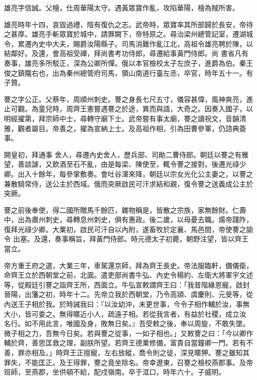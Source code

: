 \begin{pinyinscope}
 雄亮字信誠。父檜，仕周華陽太守。遇黃眾寶作亂，攻陷華陽，檜為賊所害。



 雄亮時年十四，哀毀過禮，陰有復仇之志。武帝時，眾寶率其所部歸於長安，帝待之甚厚。雄亮手斬眾寶於城中，請罪闕下，帝特原之。尋治梁州總管記室，遷湖城令，累遷內史中大夫，賜爵汝陽縣子。司馬消難作亂江北，高祖令雄亮聘於陳，以結鄰好。及還，會高祖受禪，拜尚書考功侍郎，尋遷給事黃門侍郎。尚
 書省凡有奏事，雄亮多所駁正，深為公卿所憚。俄以本官檢校太子左庶子，進爵為伯。秦王俊之鎮隴右也，出為秦州總管府司馬，領山南道行臺左丞，卒官，時年五十一。有子贊。



 謇之字公正。父蔡年，周順州刺史。謇之身長七尺五寸，儀容甚偉，風神爽亮，進止可觀。為童兒時，周齊王憲嘗遇謇之於途，異而與語，大奇之。因奏入國子，以明經擢第，拜宗師中士，尋轉守廟下士。武帝嘗有事太廟，謇之讀祝文，音韻清雅，觀者屬目。帝善之，擢為宣納上士。及高祖作相，引為田曹參軍，仍諮典簽事。



 開皇初，拜通事
 舍人，尋遷內史舍人，歷兵部、司勛二曹侍郎。朝廷以謇之有雅望，善談謔，又飲酒至石不亂，由是每梁、陳使至，輒令謇之接對。後遷光祿少卿。出入十餘年，每參掌敷奏。會吐谷渾來降，朝廷以宗女光化公主妻之，以謇之兼散騎常侍，送公主於西域。俄而突厥啟民可汗求結和親，復令謇之送義成公主於突厥。



 謇之前後奉使，得二國所贈馬千餘匹，雜物稱是，皆散之宗族，家無餘財。仁壽中，出為肅州刺史，尋轉息州刺史，俱有惠政。後二歲，以母憂去職。煬帝踐阼，復拜光祿少卿。大業初，啟民可汗自以內附，遂畜牧於定襄、馬邑間，帝使謇之諭令
 出塞。及還，奏事稱旨，拜黃門侍郎。時元德太子初薨，朝野注望，皆以齊王當立。



 帝方重王府之選，大業三年，車駕還京師，拜為齊王長史。帝法服臨軒，備儀衛，命齊王立於西朝堂之前，北面。遣吏部尚書牛弘、內史令楊約、左衛大將軍宇文述等，從殿廷引謇之詣齊王所，西面立。牛弘宣敕謂齊王曰：「我昔階緣恩寵，啟封晉陽，出籓之初，時年十二。先帝立我於西朝堂，乃令高熲、虞慶則、元旻等，從內送王子相於我。於時誡我曰：『以汝幼沖，未更世事，今令子相作輔於汝，事無大小，皆可委之。無得暱近小人，疏遠子相。若從我言者，有益於社稷，成立汝
 名行。如不用此言，唯國及身，敗無日矣。』吾受敕之後，奉以周旋，不敢失墜。微子相之力，吾無今日矣。若與謇之從事，一如子相也。」又敕謇之曰：「今以卿作輔於齊，善思匡救之理，副朕所望。若齊王德業修備，富貴自當鐘卿一門。若有不善，罪亦相及。」時齊王正擅寵，左右放縱，喬令則之徒，深見暱狎。謇之雖知其罪失，不能匡正。及王得罪，謇之竟坐除名。帝幸遼東，召謇之檢校燕郡事。及帝班師，至燕郡，坐供頓不給，配戍嶺南。卒于洭口，時年六十。子威明。




\end{pinyinscope}
